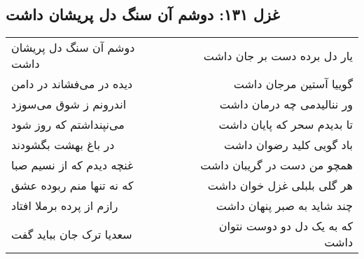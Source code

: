 \begin{center}
\section*{غزل ۱۳۱: دوشم آن سنگ دل پریشان داشت}
\label{sec:131}
\begin{longtable}{l p{0.5cm} r}
دوشم آن سنگ دل پریشان داشت
&&
یار دل برده دست بر جان داشت
\\
دیده در می‌فشاند در دامن
&&
گوییا آستین مرجان داشت
\\
اندرونم ز شوق می‌سوزد
&&
ور ننالیدمی چه درمان داشت
\\
می‌نپنداشتم که روز شود
&&
تا بدیدم سحر که پایان داشت
\\
در باغ بهشت بگشودند
&&
باد گویی کلید رضوان داشت
\\
غنچه دیدم که از نسیم صبا
&&
همچو من دست در گریبان داشت
\\
که نه تنها منم ربوده عشق
&&
هر گلی بلبلی غزل خوان داشت
\\
رازم از پرده برملا افتاد
&&
چند شاید به صبر پنهان داشت
\\
سعدیا ترک جان بباید گفت
&&
که به یک دل دو دوست نتوان داشت
\\
\end{longtable}
\end{center}
